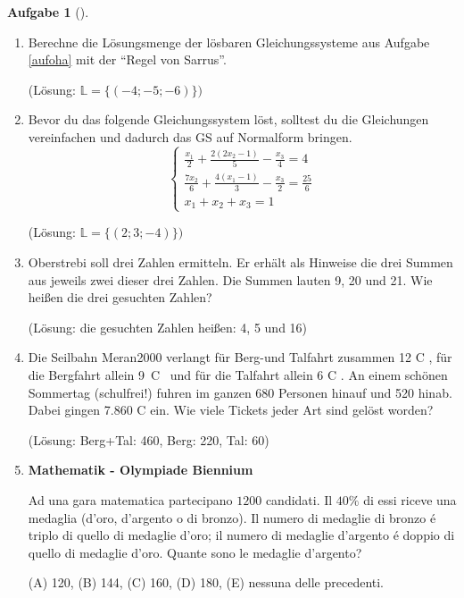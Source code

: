 \documentclass[a4paper, twoside, parskip, 10pt, smallheadings]{scrbook}
\newcommand\euro{{\sffamily C%
    \makebox[0pt][l]{\kern-.70em\mbox{--}}%
    \makebox[0pt][l]{\kern-.68em\raisebox{.25ex}{--}}}}
\theoremstyle{plain}
\theoremstyle{definition}
\newtheorem{Auf}{Aufgabe}%
\newenvironment{fshaded}{%
\def\FrameCommand{\fcolorbox{framecolor}{shadecolor}}%
\MakeFramed {\FrameRestore}}%
{\endMakeFramed}
\newenvironment{fauf}[1][]{\definecolor{shadecolor}{rgb}{.58,.788,1}%
\definecolor{framecolor}{rgb}{.13,.25,.9}%
\begin{fshaded}\begin{Auf}[#1]}{\end{Auf}\end{fshaded}}
\newcommand{\ba}{\begin{fauf}}
\newcommand{\ea}{\end{fauf}}
\begin{document}
\ba 
\begin{enumerate}
\item Berechne die L\"{o}sungsmenge der l\"{o}sbaren Gleichungssysteme aus Aufgabe
        \ref{aufoha} mit der "`Regel von Sarrus"'.

\hfill (L\"{o}sung: $\mathbb{L}=\{(-4; -5; -6)\})$

\item Bevor du das folgende Gleichungssystem l\"{o}st, solltest du die Gleichungen
      vereinfachen und dadurch das GS auf Normalform bringen.
    \begin{displaymath}
       \left\{
       \begin{array}{l}
          \frac{x_1}{2}+\frac{2(2x_2-1)}{5}-\frac{x_3}{4}=4\\
          \frac{7x_2}{6}+\frac{4(x_1-1)}{3}-\frac{x_3}{2}=\frac{25}{6}\\
          x_1+x_2+x_3=1
       \end{array}
       \right.
   \end{displaymath}

\hfill (L\"{o}sung: $\mathbb{L}=\{(2; 3; -4)\})$

\item Oberstrebi soll drei Zahlen ermitteln. Er erh\"{a}lt als Hinweise die
      drei Summen aus jeweils zwei dieser drei Zahlen. Die Summen lauten
      9, 20 und 21. Wie hei{\ss}en die drei gesuchten Zahlen?

\hfill (L\"{o}sung: die gesuchten Zahlen hei{\ss}en: 4, 5 und 16)

\item Die Seilbahn Meran2000 verlangt f\"{u}r Berg-und Talfahrt zusammen 12 \euro , f\"{u}r die Bergfahrt allein 9\, \euro \, und f\"{u}r die Talfahrt allein
      6 \euro . An einem sch\"{o}nen Sommertag (schulfrei!) fuhren im ganzen
      680 Personen hinauf und 520 hinab. Dabei gingen 7.860 \euro ein.
      Wie viele Tickets jeder Art sind gel\"{o}st worden?

\hfill (L\"{o}sung: Berg+Tal: 460, Berg: 220, Tal: 60)








\item {\bf Mathematik - Olympiade Biennium}

Ad una gara matematica partecipano $1200$ candidati. Il $40\%$ di essi riceve una medaglia (d'oro, d'argento o di bronzo). Il numero di medaglie di bronzo \'e triplo di quello di medaglie d'oro; il numero di medaglie d'argento \'e doppio di quello di medaglie d'oro. Quante sono le medaglie d'argento?

(A)	120, (B) 144, (C) 160, (D) 180, (E) nessuna delle precedenti.
\end{enumerate}
\ea 
\end{document}
